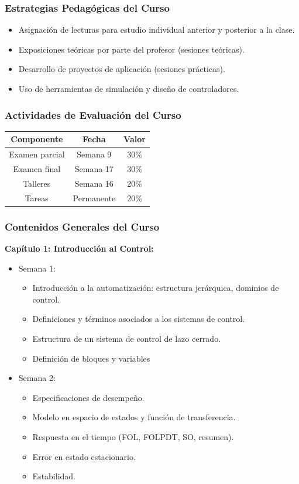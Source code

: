 \documentclass[aspectratio=169,handout]{beamer}
\theoremstyle{definition}
\theoremstyle{plain}
\theoremstyle{remark}
\newcounter{saveenumi}
\newcommand{\seti}{\setcounter{saveenumi}{\value{enumi}}}
\begin{document}
\begin{frame}[<+->]\frametitle{Estrategias Pedagógicas del Curso}
\begin{itemize}
  \item Asignación de lecturas para estudio individual anterior y posterior a la clase.
  \item Exposiciones teóricas por parte del profesor (sesiones teóricas).
  \item Desarrollo de proyectos de aplicación (sesiones prácticas).
  \item Uso de herramientas de simulación y diseño de controladores.
\end{itemize}
\end{frame}

\begin{frame}[c]\frametitle{Actividades de Evaluación del Curso}
\centering
\begin{tabular}{c|c|c}
  \textbf{Componente}     & \textbf{Fecha}    & \textbf{Valor}\\
  \hline
  Examen parcial & Semana 9 & 30\% \\
  Examen final & Semana 17 & 30\% \\
  Talleres & Semana 16 & 20\% \\
  Tareas & Permanente & 20\%
\end{tabular}
\end{frame}

\begin{frame}[<+->]\frametitle{Contenidos Generales del Curso}
\textbf{Capítulo 1: Introducción al Control:}
\begin{itemize}
  \item Semana 1: 
  \begin{itemize}
    \item Introducción a la automatización: estructura jerárquica, dominios de control.
    \item Definiciones y términos asociados a los sistemas de control.
    \item Estructura de un sistema de control de lazo cerrado.
    \item Definición de bloques y variables
  \end{itemize}
  \item Semana 2:
  \begin{itemize}
    \item Especificaciones de desempeño.
    \item Modelo en espacio de estados y función de transferencia.
    \item Respuesta en el tiempo (FOL, FOLPDT, SO, resumen).
    \item Error en estado estacionario.
    \item Estabilidad.
  \end{itemize}
  \seti
\end{itemize}
\end{frame}
\end{document}
